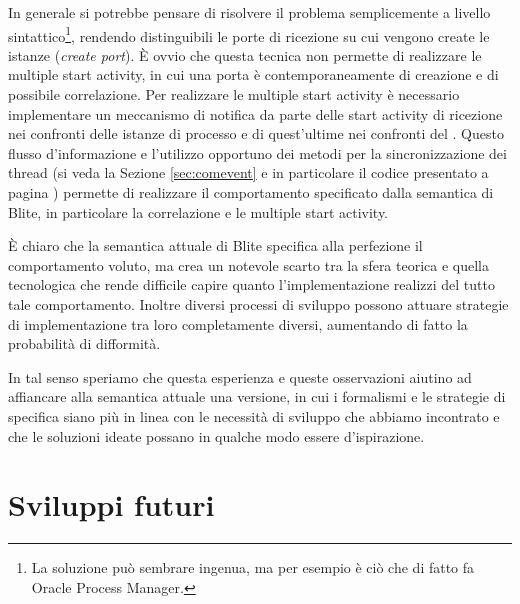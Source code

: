 In generale si potrebbe pensare di risolvere il problema semplicemente a livello
sintattico\footnote{La soluzione può sembrare ingenua, ma per esempio è ciò che
di fatto fa Oracle Process Manager.}, rendendo distinguibili le porte di
ricezione su cui vengono create le istanze (\emph{create port}). \`E ovvio che
questa tecnica non permette di realizzare le multiple start activity, in cui una
porta è contemporaneamente di creazione e di possibile correlazione. Per
realizzare le multiple start activity è necessario implementare un meccanismo di
notifica da parte delle start activity di ricezione nei confronti delle istanze
di processo e di quest'ultime nei confronti del . Questo
flusso d'informazione e l'utilizzo opportuno dei metodi per la sincronizzazione
dei thread (si veda la Sezione \ref{sec:comevent} e in particolare il codice
presentato a pagina \pageref{cod:wait}) permette di realizzare il comportamento
specificato dalla semantica di Blite, in particolare la correlazione e le
multiple start activity.


\`E chiaro che la semantica attuale di Blite specifica alla perfezione il
comportamento voluto, ma crea un notevole scarto tra la sfera teorica e quella
tecnologica che rende difficile capire quanto l'implementazione realizzi del
tutto tale comportamento. Inoltre diversi processi di sviluppo possono attuare
strategie di implementazione tra loro completamente diversi, aumentando di fatto
la probabilità di difformità.

In tal senso speriamo che questa esperienza e queste osservazioni
aiutino ad affiancare alla semantica attuale una versione, in cui i formalismi e
le strategie di specifica siano più in linea con le necessità di sviluppo che
abbiamo incontrato e che le soluzioni ideate possano in qualche modo
essere d'ispirazione.
  
\section{Sviluppi futuri}

